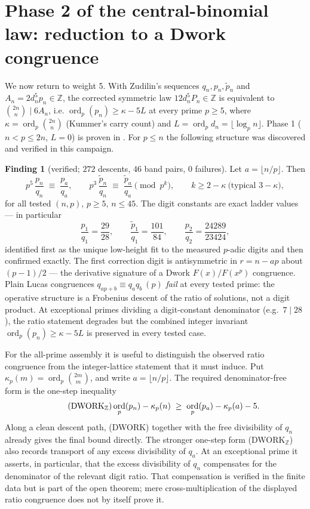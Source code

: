 \documentclass[11pt]{article}
\theoremstyle{definition}\newtheorem{remark}[theorem]{Remark}
\newtheorem{finding}[theorem]{Finding}
\DeclareMathOperator{\ord}{ord}\DeclareMathOperator{\den}{den}\DeclareMathOperator{\lcm}{lcm}
\newcommand{\Z}{\mathbb{Z}}\newcommand{\Q}{\mathbb{Q}}\newcommand{\Fp}{\mathbb{F}_p}
\newcommand{\wt}{\widetilde}\newcommand{\dn}{d_n}
\begin{document}
\section{Phase 2 of the central-binomial law: reduction to a Dwork
congruence}\label{sec:dwork}

We now return to weight 5. With Zudilin's sequences $q_n,p_n,\wt p_n$
\cite{Zud02} and $A_n=2d_n^5p_n\in\Z$, the corrected symmetric law
$12d_n^5P_n\in\Z$ is equivalent to $\binom{2n}{n}\mid6A_n$, i.e.
$\ord_p(p_n)\ge\kappa-5L$ at every prime $p\ge5$, where
$\kappa=\ord_p\binom{2n}{n}$ (Kummer's carry count) and
$L=\ord_p d_n=\lfloor\log_p n\rfloor$. Phase 1 ($n<p\le2n$, $L=0$) is proven
in \cite{CBcert}. For $p\le n$ the following structure was discovered and
verified in this campaign.

\begin{finding}[verified; $272$ descents, $46$ band pairs, $0$ failures]
\label{find:dwork}
Let $a=\lfloor n/p\rfloor$. Then
\[
p^{5}\,\frac{p_n}{q_n}\;\equiv\;\frac{p_a}{q_a},
\qquad
p^{3}\,\frac{\wt p_n}{q_n}\;\equiv\;\frac{\wt p_a}{q_a}
\pmod{p^{k}},\qquad k\ge 2-\kappa\ \text{(typical }3-\kappa\text{)},
\]
for all tested $(n,p)$, $p\ge5$, $n\le45$. The digit constants are exact
ladder values --- in particular
\[
\frac{p_1}{q_1}=\frac{29}{28},\qquad
\frac{\wt p_1}{q_1}=\frac{101}{84},\qquad
\frac{p_2}{q_2}=\frac{24289}{23424},
\]
identified first as the unique low-height fit to the measured $p$-adic digits
and then confirmed exactly. The first correction digit is antisymmetric in
$r=n-ap$ about $(p-1)/2$ --- the derivative signature of a Dwork
$F(x)/F(x^p)$ congruence. Plain Lucas congruences
$q_{ap+b}\equiv q_aq_b\ (p)$ \emph{fail} at every tested prime: the operative
structure is a Frobenius descent of the ratio of solutions, not a digit
product. At exceptional primes dividing a digit-constant denominator (e.g.\
$7\mid28$), the ratio statement degrades but the combined integer invariant
$\ord_p(p_n)\ge\kappa-5L$ is preserved in every tested case.
\end{finding}

For the all-prime assembly it is useful to distinguish the observed ratio
congruence from the integer-lattice statement that it must induce. Put
$\kappa_p(m)=\ord_p\binom{2m}{m}$, and write $a=\lfloor n/p\rfloor$. The
required denominator-free form is the one-step inequality
\begin{equation}
 \tag{DWORK$_\Z$}\label{eq:dworkZ}
 \ord_p(p_n)-\kappa_p(n)
 \;\ge\;\ord_p(p_a)-\kappa_p(a)-5.
\end{equation}
Along a clean descent path, (DWORK) together with the free divisibility of
$q_n$ already gives the final bound directly.  The stronger one-step form
(DWORK$_\Z$) also records transport of any excess divisibility of $q_a$. At an
exceptional prime it asserts, in particular, that the excess divisibility of
$q_n$ compensates for the denominator of the relevant digit ratio. That
compensation is verified in the finite data but is part of the open theorem;
mere cross-multiplication of the displayed ratio congruence does not by itself
prove it.
\end{document}
